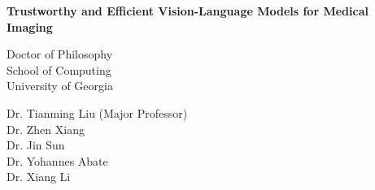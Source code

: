 \begin{titlepage}\centering
\vspace*{0.6in}
{\LARGE\bfseries Trustworthy and Efficient Vision-Language Models for Medical Imaging\par}
\vspace{0.5in}{\Large A Dissertation Prospectus\par}
\vspace{0.35in}{\Large Hanqi Jiang\par}
\vspace{0.3in}Doctor of Philosophy\\School of Computing\\University of Georgia\par
\vspace{0.4in}{\large\bfseries Committee}\par\vspace{0.1in}
Dr. Tianming Liu (Major Professor)\\Dr. Zhen Xiang\\Dr. Jin Sun\\Dr. Yohannes Abate\\Dr. Xiang Li\par
\end{titlepage}
